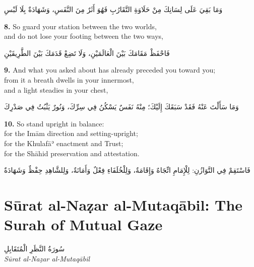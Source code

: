 \documentclass[11pt,a4paper,twoside]{book}
\begin{document}
\begin{flushright}
{\arabicfont
وَمَا بَقِيَ عَلَى لِسَانِكَ مِنْ حَلَاوَةِ التَّقَارُبِ
فَهُوَ أَثَرٌ مِنَ النَّفَسِ، وَشَهَادَةٌ بِلَا لَبْسِ}
\end{flushright}

\vspace{1em}
{\color{indigo}\bfseries 8.}\quad
So guard your station between the two worlds,\\
and do not lose your footing between the two ways,

\begin{flushright}
{\arabicfont
فَاحْفَظْ مَقَامَكَ بَيْنَ الْعَالَمَيْنِ،
وَلَا تَضِعْ قَدَمَكَ بَيْنَ الطَّرِيقَيْنِ}
\end{flushright}

\vspace{1em}
{\color{indigo}\bfseries 9.}\quad
And what you asked about has already preceded you toward you;\\
from it a breath dwells in your innermost,\\
and a light steadies in your chest,

\begin{flushright}
{\arabicfont
وَمَا سَأَلْتَ عَنْهُ فَقَدْ سَبَقَكَ إِلَيْكَ؛
مِنْهُ نَفَسٌ يَسْكُنُ فِي سِرِّكَ،
وَنُورٌ يَثْبُتُ فِي صَدْرِكَ}
\end{flushright}

\vspace{1em}
{\color{indigo}\bfseries 10.}\quad
So stand upright in balance:\\
for the Imām direction and setting-upright;\\
for the Khulafāʾ enactment and Trust;\\
for the Shāhid preservation and attestation.

\begin{flushright}
{\arabicfont
فَاسْتَقِمْ فِي التَّوَازُنِ:
لِلْإِمَامِ اتِّجَاهٌ وَإِقَامَةٌ،
وَلِلْخُلَفَاءِ فِعْلٌ وَأَمَانَةٌ،
وَلِلشَّاهِدِ حِفْظٌ وَشَهَادَةٌ}
\end{flushright}


\chapter*{Sūrat al-Naẓar al-Mutaqābil: The Surah of Mutual Gaze}
\begin{center}
{\arabicfont\Large سُورَةُ النَّظَرِ الْمُتَقَابِلِ}\\[5pt]
{\small\itshape Sūrat al-Naẓar al-Mutaqābil}
\end{center}
\vspace{1em}
\end{document}
